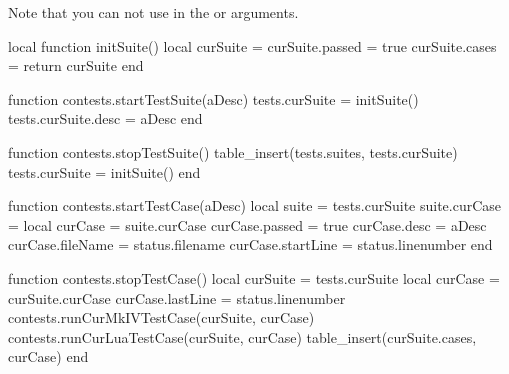 
\startchapter[title=Unit Test Suites]

Note that you can not use  in the \type{\startTestSuite} or 
\type{\startTestCase} arguments. 

\startMkIVCode

\def\startTestSuite[#1]{%
  \startsubsection[title=Test Suite: #1]
  \directlua{thirddata.contests.startTestSuite("#1")}
}

\def\stopTestSuite{%
  \stopsubsection%
  \directlua{thirddata.contests.stopTestSuite()}
}

\def\startTestCase[#1]{%
  \starttextrule{Test case}
  \noindent {\tfa #1} \godown[2ex]
  \directlua{thirddata.contests.startTestCase("#1")}
}

\def\stopTestCase{%
  \directlua{thirddata.contests.stopTestCase()}
  \stoptextrule%
}

\def\reportFailures{%
  \directlua{thirddata.contests.reportFailures()}
}

\stopMkIVCode

\startLuaCode

local function initSuite()
  local curSuite = {}
  curSuite.passed = true
  curSuite.cases  = {}
  return curSuite
end

function contests.startTestSuite(aDesc)
  tests.curSuite      = initSuite()
  tests.curSuite.desc = aDesc
end

function contests.stopTestSuite()
  table_insert(tests.suites, tests.curSuite)
  tests.curSuite = initSuite()
end

function contests.startTestCase(aDesc)
  local suite       = tests.curSuite
  suite.curCase     = {}
  local curCase     = suite.curCase
  curCase.passed    = true
  curCase.desc      = aDesc
  curCase.fileName  = status.filename
  curCase.startLine = status.linenumber
end

function contests.stopTestCase()
  local curSuite   = tests.curSuite
  local curCase    = curSuite.curCase
  curCase.lastLine = status.linenumber
  contests.runCurMkIVTestCase(curSuite, curCase)
  contests.runCurLuaTestCase(curSuite, curCase)
  table_insert(curSuite.cases, curCase)
end

